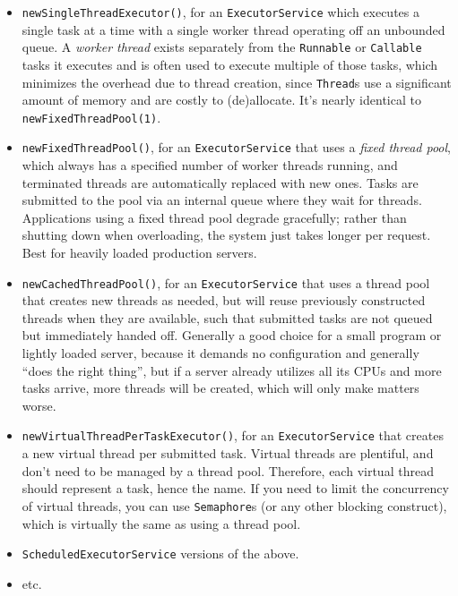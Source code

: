 \documentclass[table, xcdraw]{article}%
\begin{document}
\begin{itemize}
    \item \texttt{newSingleThreadExecutor()}, for an \texttt{ExecutorService} which executes a single task at a time with a single worker thread operating off an unbounded queue. A \emph{worker thread} exists separately from the \texttt{Runnable} or \texttt{Callable} tasks it executes and is often used to execute multiple of those tasks, which minimizes the overhead due to thread creation, since \texttt{Thread}s use a significant amount of memory and are costly to (de)allocate. It's nearly identical to \texttt{newFixedThreadPool(1)}.
    \item \texttt{newFixedThreadPool()}, for an \texttt{ExecutorService} that uses a \emph{fixed thread pool}, which always has a specified number of worker threads running, and terminated threads are automatically replaced with new ones. Tasks are submitted to the pool via an internal queue where they wait for threads. Applications using a fixed thread pool degrade gracefully; rather than shutting down when overloading, the system just takes longer per request. Best for heavily loaded production servers.
    \item \texttt{newCachedThreadPool()}, for an \texttt{ExecutorService} that uses a thread pool that creates new threads as needed, but will reuse previously constructed threads when they are available, such that submitted tasks are not queued but immediately handed off. Generally a good choice for a small program or lightly loaded server, because it demands no configuration and generally “does the right thing”, but if a server already utilizes all its CPUs and more tasks arrive, more threads will be created, which will only make matters worse.
    \item \texttt{newVirtualThreadPerTaskExecutor()}, for an \texttt{ExecutorService} that creates a new virtual thread per submitted task. Virtual threads are plentiful, and don't need to be managed by a thread pool. Therefore, each virtual thread should represent a task, hence the name. If you need to limit the concurrency of virtual threads, you can use \texttt{Semaphore}s (or any other blocking construct), which is virtually the same as using a thread pool.
    \item \texttt{ScheduledExecutorService} versions of the above.
    \item etc.
\end{itemize}
\end{document}
